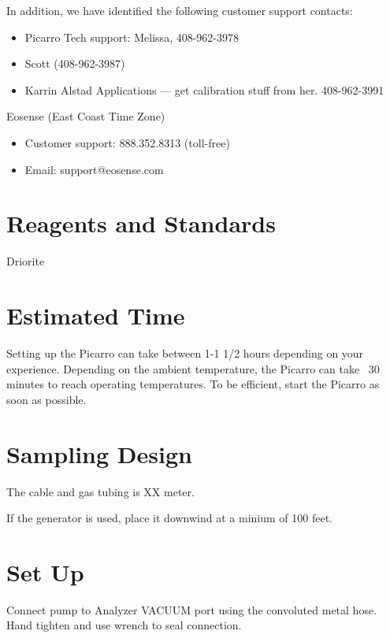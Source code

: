 \documentclass[12pt]{../SOP3}\usepackage[]{graphicx}\usepackage[]{color}
\begin{document}
\NP In addition, we have identified the following customer support contacts:

\begin{itemize}
  \item Picarro Tech support: Melissa, 408-962-3978
  \item Scott (408-962-3987)
  \item Karrin Alstad Applications --- get calibration stuff from her. 408-962-3991
\end{itemize}

\NP Eosense (East Coast Time Zone)

\begin{itemize}
  \item Customer support: 888.352.8313 (toll-free)
  \item Email: support@eosense.com
\end{itemize}

\section{Reagents and Standards}


\NP Driorite


\section{Estimated Time}

\NP Setting up the Picarro can take between 1-1 1/2 hours depending on your experience. Depending on the ambient temperature, the Picarro can take ~30 minutes to reach operating temperatures. To be efficient, start the Picarro as soon as possible.

\section{Sampling Design}

\NP The cable and gas tubing is XX meter.

\NP If the generator is used, place it downwind at a minium of 100 feet.

\section{Set Up}

\NP Connect pump to Analyzer VACUUM port using the convoluted metal hose. Hand tighten and use wrench to seal connection.
\end{document}
